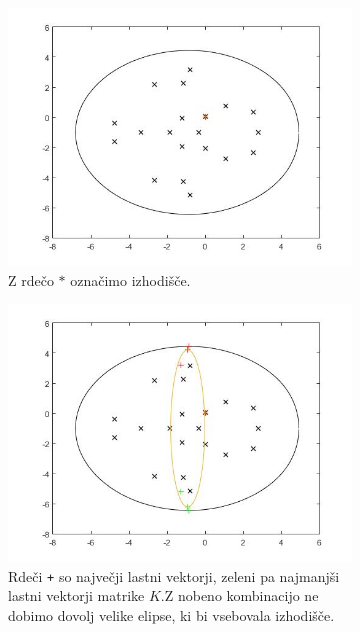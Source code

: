 \documentclass[12pt,a4paper]{amsart}
\theoremstyle{definition}
\theoremstyle{plain}
\begin{document}
\begin{figure}[H]
\renewcommand*\thesubfigure{\Alph{subfigure}}
\begin{subfigure}[t]{0.5\textwidth}
\includegraphics[width=0.9\linewidth]{RC2.jpg}
\caption{Z rdečo $\ast$ označimo izhodišče.}
\label{fig:p41}
\end{subfigure}%
\hfill
\begin{subfigure}[t]{0.5\textwidth}
\includegraphics[width=0.9\linewidth]{RC2e1.jpg}
\caption{Rdeči \verb~+~ so največji lastni vektorji, zeleni pa najmanjši lastni vektorji matrike $K$.\footnotemark[\value{footnote}] Z nobeno kombinacijo ne dobimo dovolj velike elipse, ki bi vsebovala izhodišče.}
\label{fig:p42}
\end{subfigure}
\hfill
\begin{subfigure}[t]{0.5\textwidth}

\end{subfigure}
\end{figure}
\end{document}
